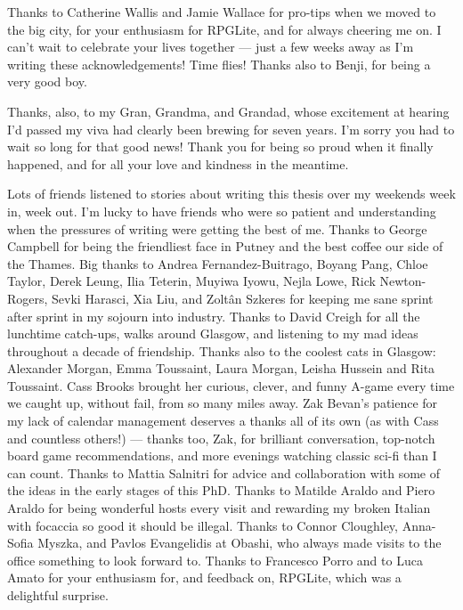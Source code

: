 {Thanks to Catherine Wallis and Jamie Wallace for pro-tips when we moved to the
big city, for your enthusiasm for RPGLite, and for always cheering me on. I
can't wait to celebrate your lives together --- just a few weeks away as I'm
writing these acknowledgements! Time flies! Thanks also to Benji, for being a
very good boy.

Thanks, also, to my Gran, Grandma, and Grandad, whose excitement at hearing I'd
passed my viva had clearly been brewing for seven years. I'm sorry you had to
wait so long for that good news! Thank you for being so proud when it finally
happened, and for all your love and kindness in the meantime.

Lots of friends listened to stories about writing this thesis over my weekends
week in, week out. I'm lucky to have friends who were so patient and
understanding when the pressures of writing were getting the best of me. Thanks
to George Campbell for being the friendliest face in Putney and the best coffee
our side of the Thames. Big thanks to Andrea Fernandez-Buitrago, Boyang Pang,
Chloe Taylor, Derek Leung, Ilia Teterin, Muyiwa Iyowu, Nejla Lowe, Rick
Newton-Rogers, Sevki Harasci, Xia Liu, and Zoltân Szkeres for keeping me sane
sprint after sprint in my sojourn into industry. Thanks to David Creigh for all
the lunchtime catch-ups, walks around Glasgow, and listening to my mad ideas
throughout a decade of friendship. Thanks also to the coolest cats in Glasgow:
Alexander Morgan, Emma Toussaint, Laura Morgan, Leisha Hussein and Rita
Toussaint. Cass Brooks brought her curious, clever, and funny A-game every time
we caught up, without fail, from so many miles away. Zak Bevan's patience for my
lack of calendar management deserves a thanks all of its own (as with Cass and
countless others!) --- thanks too, Zak, for brilliant conversation, top-notch
board game recommendations, and more evenings watching classic sci-fi than I can
count. Thanks to Mattia Salnitri for advice and collaboration with some of the
ideas in the early stages of this PhD. Thanks to Matilde Araldo and Piero Araldo
for being wonderful hosts every visit and rewarding my broken Italian with
focaccia so good it should be illegal. Thanks to Connor Cloughley, Anna-Sofia
Myszka, and Pavlos Evangelidis at Obashi, who always made visits to the office
something to look forward to. Thanks to Francesco Porro and to Luca Amato for
your enthusiasm for, and feedback on, RPGLite, which was a delightful surprise.



}
